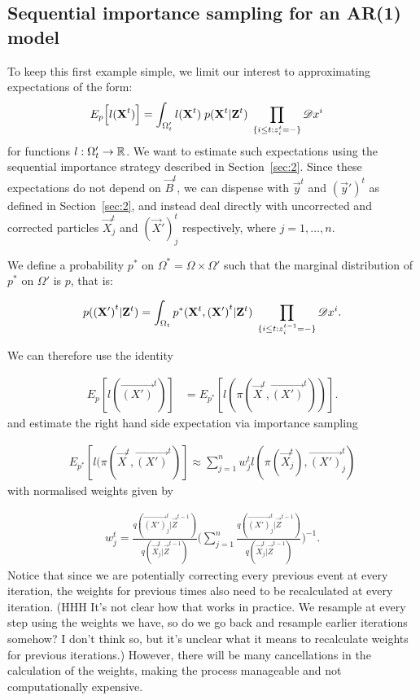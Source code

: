 \subsection{Sequential importance sampling for an AR(1) model}
\label{sec:5}

To keep this first example simple, we limit our interest to approximating expectations of the form:
\begin{align*}
    E_{p} \Big[l(\mathbf{X}^{t}) \Big] &=  \int_{\Omega_t'} l(\mathbf{X}^{t})\; p(\mathbf{X}^{t} | \mathbf{Z}^{t})\; \prod_{ \{ i \leq t  : z^t_{i} = - \} } \mathscr{D} x^i
\end{align*}
for functions $l: \Omega_t'  \rightarrow \mathbb R$. We want to estimate such expectations using the sequential importance strategy described in Section~\ref{sec:2}. Since these expectations do not depend on $\vec{B}^t$, we can dispense with $\vec{y}^t$ and $(\vec{y}')^t$ as defined in Section~\ref{sec:2}, and instead deal directly with uncorrected and corrected particles $\vec{X}_j^t$ and $(\vec{X}')_j^t$ respectively, where $j = 1, \ldots, n$.

We define a probability $p^*$ on $\Omega^* = \Omega \times \Omega'$ such that the marginal distribution of $p^*$ on $\Omega'$ is $p$, that is:

\begin{equation*}
    p(\mathbf{(X')}^t | \mathbf{Z}^t) = \int_{\Omega_t} p^*(\mathbf{X}^t, \mathbf{(X')}^t | \mathbf{Z}^t)\; \prod_{ \{ i \leq t  : z^{t-1}_{i} = - \} } \mathscr{D} x^i.
\end{equation*}

We can therefore use the identity

\begin{align*}
    E_{p}[l(\vec{(X')}^{t})]  &=  E_{p^*}[l(\pi (\vec{X}^{t}, \vec{(X')}^{t}))].
\end{align*}
and estimate the right hand side expectation via importance sampling

\begin{align*}
    E_{p^*}[l(\pi (\vec{X}^{t}, \vec{(X')}^{t})] \approx \sum_{j=1}^n  w^{t}_j l(\pi (\vec{X}^{t}_j), \vec{(X')}^{t}_j)
\end{align*}
with normalised weights given by

\begin{multline*}
    w^{t}_j = \frac{q(\vec{(X')}^{t}_j | \vec{Z}^{t-1}) }{q(\vec{X}^{t}_j | \vec{Z}^{t-1})}\Bigg( \sum_{j=1}^n  \frac{q(\vec{(X')}^{t}_j | \vec{Z}^{t-1}) }{q(\vec{X}^{t}_j | \vec{Z}^{t-1})}\Bigg)^{-1}.
\end{multline*}
Notice that since we are potentially correcting every previous event at every iteration, the weights for previous times also need to be recalculated at every iteration. {\color{red} (HHH It's not clear how that works in practice. We resample at every step using the weights we have, so do we go back and resample earlier iterations somehow? I don't think so, but it's unclear what it means to recalculate weights for previous iterations.)} However, there will be many cancellations in the calculation of the weights, making the process manageable and not computationally expensive.

